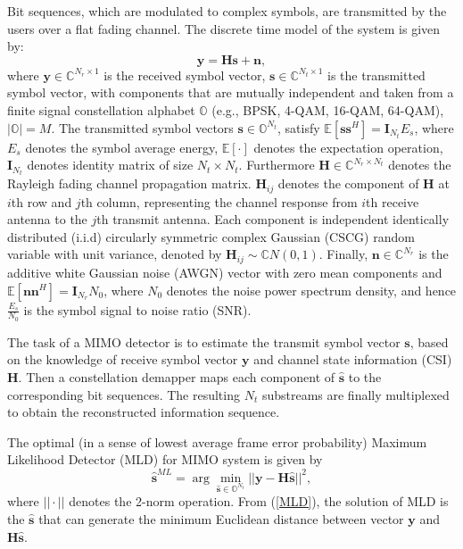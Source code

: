 \documentclass[12pt, draftclsnofoot, onecolumn]{IEEEtran}
\begin{document}
Bit sequences, which are modulated to complex symbols, are transmitted by the users over a flat fading channel. The discrete time model of the system is given by:
\begin{equation}
\mathbf{y}=\mathbf{H}\mathbf{s}+\mathbf{n},   \label{discrete time MIMO system}
\end{equation}
where $\mathbf{y}\in\mathbb{C}^{N_{r}\times 1}$ is the received symbol vector, $\mathbf{s}\in \mathbb{C}^{N_{t}\times 1}$ is the transmitted symbol vector, with components that are mutually independent and taken from a finite signal constellation alphabet $\mathbb{O}$ (e.g., BPSK, 4-QAM, 16-QAM, 64-QAM), $|\mathbb{O}|=M$. The transmitted symbol vectors $\mathbf{s}\in \mathbb{O}^{N_{t}}$, satisfy $\mathbb{E}[\mathbf{s}\mathbf{s}^{H}]=\mathbf{I}_{N_t}E_{s}$, where $E_{s}$ denotes the symbol average energy, $\mathbb{E}[\cdot]$ denotes the expectation operation, $\mathbf{I}_{N_{t}}$ denotes identity matrix of size $N_{t}\times N_{t}$. Furthermore $\mathbf{H}\in \mathbb{C}^{N_{r}\times N_{t}}$ denotes the Rayleigh fading channel propagation matrix. $\mathbf{H}_{ij}$ denotes the component of $\mathbf{H}$ at $i$th row and $j$th column, representing the channel response from $i$th receive antenna to the $j$th transmit antenna. Each component is independent identically distributed (i.i.d) circularly symmetric complex Gaussian (CSCG) random variable with unit variance, denoted by $\mathbf{H}_{ij}\sim \mathbb{C}N(0,1)$. Finally, $\mathbf{n}\in \mathbb{C}^{N_{r}}$ is the additive white Gaussian noise (AWGN) vector with zero mean components and $\mathbb{E}[\mathbf{n}\mathbf{n}^{H}]=\mathbf{I}_{N_{r}}N_{0}$, where $N_{0}$ denotes the noise power spectrum density, and hence $\frac{E_{s}}{N_{0}}$ is the symbol signal to noise ratio (SNR). 

The task of a MIMO detector is to estimate the transmit symbol vector $\mathbf{s}$, based on the knowledge of receive symbol vector $\mathbf{y}$ and channel state information (CSI) $\mathbf{H}$. Then a constellation demapper maps each component of $\hat{\mathbf{s}}$ to the corresponding bit sequences. The resulting $N_{t}$ substreams are finally multiplexed to obtain the reconstructed information sequence.

The optimal (in a sense of lowest average frame error probability) Maximum Likelihood Detector (MLD) for MIMO system is given by
\begin{equation}
\hat{\mathbf{s}}^{ML}=\arg\min_{\hat{\mathbf{s}}\in \mathbb{O}^{N_{t}}}||\mathbf{y}-\mathbf{H}\hat{\mathbf{s}}||^{2},
\label{MLD}
\end{equation}
where $||\cdot||$ denotes the 2-norm operation. From (\ref{MLD}), the solution of MLD is the $\hat{\mathbf{s}}$ that can generate the minimum Euclidean distance between vector $\mathbf{y}$ and $\mathbf{H}\hat{\mathbf{s}}$.
\end{document}
